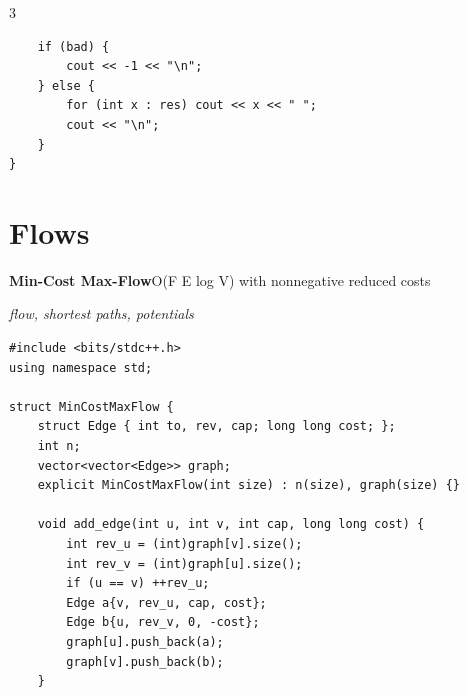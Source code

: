 \documentclass[8pt,a4paper,landscape]{article}
\begin{document}
\begin{multicols}{3}
\begin{lstlisting}
    if (bad) {
        cout << -1 << "\n";
    } else {
        for (int x : res) cout << x << " ";
        cout << "\n";
    }
}
\end{lstlisting}
\vspace{1pt}
\section*{Flows}
\textbf{Min-Cost Max-Flow}\hfill{\scriptsize O(F E log V) with nonnegative reduced costs}\par
{\scriptsize\itshape flow, shortest paths, potentials}\par
\begin{lstlisting}
#include <bits/stdc++.h>
using namespace std;

struct MinCostMaxFlow {
    struct Edge { int to, rev, cap; long long cost; };
    int n;
    vector<vector<Edge>> graph;
    explicit MinCostMaxFlow(int size) : n(size), graph(size) {}

    void add_edge(int u, int v, int cap, long long cost) {
        int rev_u = (int)graph[v].size();
        int rev_v = (int)graph[u].size();
        if (u == v) ++rev_u;
        Edge a{v, rev_u, cap, cost};
        Edge b{u, rev_v, 0, -cost};
        graph[u].push_back(a);
        graph[v].push_back(b);
    }


\end{lstlisting}
\end{multicols}
\end{document}
